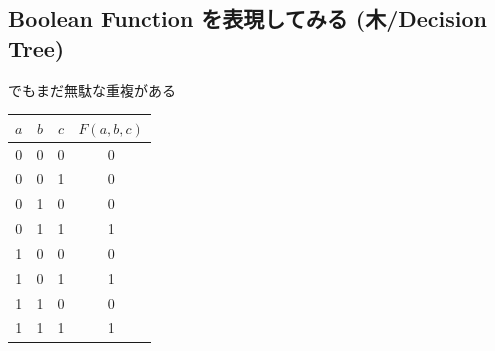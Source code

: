 \begin{container-fluid}
\begin{row-fluid}
\begin{span4}
\end{span4}
\end{row-fluid}
\end{container-fluid}

\subsection{Boolean Function を表現してみる (木/Decision Tree)}
\label{sec-4-4}

でもまだ無駄な重複がある

\begin{container-fluid}
\begin{row-fluid}
\begin{span8}
\begin{center}
\begin{tabular}{|ccc|c|}
$a$ & $b$ & $c$ & $F(a,b,c)$\\
\hline
0 & 0 & 0 & 0\\
0 & 0 & 1 & 0\\
0 & 1 & 0 & 0\\
0 & 1 & 1 & 1\\
1 & 0 & 0 & 0\\
1 & 0 & 1 & 1\\
1 & 1 & 0 & 0\\
1 & 1 & 1 & 1\\
\end{tabular}
\end{center}
\end{span8}
\begin{span4}

\end{span4}
\end{row-fluid}
\end{container-fluid}
